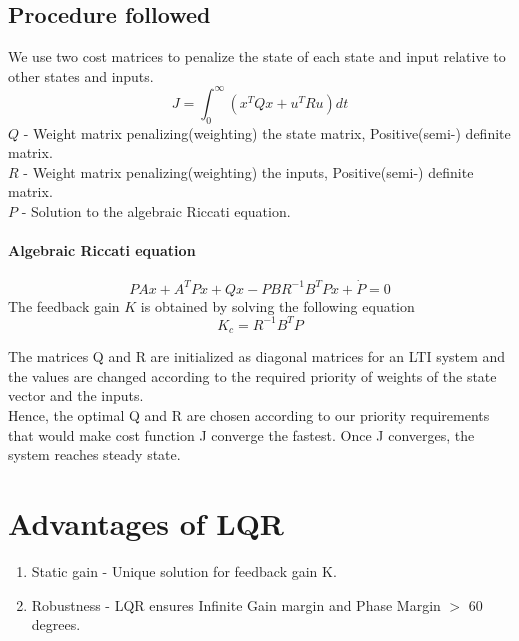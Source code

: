 \subsection{Procedure followed}
We use two cost matrices to penalize the state of each state and input relative to other states and inputs.
\begin{equation*}
  J = \int^\infty_0 (x^TQx + u^T Ru)dt
\end{equation*}
$Q$ - Weight matrix penalizing(weighting) the state matrix, Positive(semi-) definite matrix.\\
$R$ - Weight matrix penalizing(weighting) the inputs, Positive(semi-) definite matrix.\\
$P$ - Solution to the algebraic Riccati equation.
\newpage
\paragraph{Algebraic Riccati equation}
\begin{equation*}
  PAx + A^TPx + Qx - PBR^{-1}B^TPx +\dot{P} = 0
\end{equation*}
The feedback gain $K$ is obtained by solving the following equation
\begin{equation}
K_c = R^{-1}B^TP
\end{equation}

The matrices Q and R are initialized as diagonal matrices for an LTI system and the values are changed according to the required priority of weights of the state vector and the inputs.\\

Hence, the optimal Q and R are chosen according to our priority requirements that would make cost function J converge the fastest. Once J converges, the system reaches steady state.
\section{Advantages of LQR}
\begin{enumerate}
  \item Static gain -
  Unique solution for feedback gain K.
\item Robustness -
 LQR ensures Infinite Gain margin and Phase Margin $>$ 60 degrees.
\end{enumerate}
